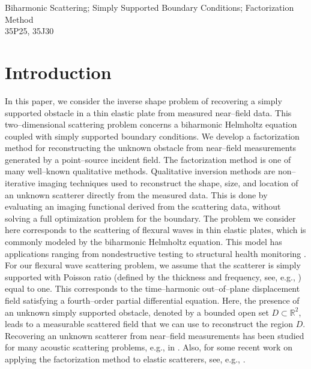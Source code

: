 \documentclass{article}
\newcommand{\R}{\mathbb{R}}
\numberwithin{equation}{section}
\begin{document}
 Biharmonic Scattering; Simply Supported Boundary Conditions; Factorization Method\\

 35P25, 35J30

\section{Introduction}
In this paper, we consider the inverse shape problem of recovering a simply supported obstacle in a thin elastic plate from measured near--field data. This two--dimensional scattering problem concerns a biharmonic Helmholtz equation coupled with simply supported boundary conditions. We develop a factorization method for reconstructing the unknown obstacle from near--field measurements generated by a point--source incident field. The factorization method is one of many well--known qualitative methods. Qualitative inversion methods are non--iterative imaging techniques used to reconstruct the shape, size, and location of an unknown scatterer directly from the measured data. This is done by evaluating an imaging functional derived from the scattering data, without solving a full optimization problem for the boundary. The problem we consider here corresponds to the scattering of flexural waves in thin elastic plates, which is commonly modeled by the biharmonic Helmholtz equation. This model has applications ranging from nondestructive testing to structural health monitoring \cite{applicationref1,applicationref2,applicationref3,applicationref4}. For our flexural wave scattering problem, we assume that the scatterer is simply supported with Poisson ratio (defined by the thickness and frequency, see, e.g., \cite{ffdata-simpsupport}) equal to one. This corresponds to the time--harmonic out--of--plane displacement field satisfying a fourth--order partial differential equation. Here, the presence of an unknown simply supported obstacle, denoted by a bounded open set $D \subset \R^2$, leads to a measurable scattered field that we can use to reconstruct the region $D$. Recovering an unknown scatterer from near--field measurements has been studied for many acoustic scattering problems, e.g., in \cite{nf-fft-dsm,HarrisRome,Hu-nfFM,shixu-nfFM,QinColton}. Also, for some recent work on applying the factorization method to elastic scatterers, see, e.g., \cite{ElasticFM1,ElasticFM2}. 
\end{document}
